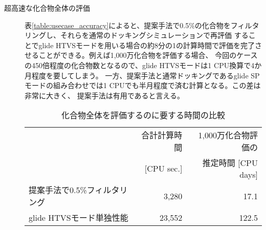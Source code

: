 \begin{description}
\item[超高速な化合物全体の評価]
	表\ref{table:usecase_accuracy}によると、提案手法で0.5\%の化合物をフィルタリングし、それらを通常のドッキングシミュレーションで再評価
	することでglide HTVSモードを用いる場合の約8分の1の計算時間で評価を完了させることができる。例えば1,000万化合物を評価する場合、
	今回のケースの450倍程度の化合物数となるので、glide HTVSモードは1 CPU換算で4か月程度を要してしまう。
	一方、提案手法と通常ドッキングであるglide SPモードの組み合わせでは1 CPUでも半月程度で済む計算となる。この差は非常に大きく、
	提案手法は有用であると言える。
\begin{table}[htbp] \centering
	\caption{化合物全体を評価するのに要する時間の比較}
	\label{calc_speed_ultrafast}
	\begin{tabular}{l|rr}
	\hline
												&合計計算時間	&1,000万化合物評価の		\\ 
												&[CPU sec.]		&推定時間 [CPU days]		\\ \hline
	提案手法で0.5\%フィルタリング	&3,280				&17.1								\\
	glide HTVSモード単独性能		&23,552				&122.5								\\ \hline
	\end{tabular}
\end{table}


\end{description}
